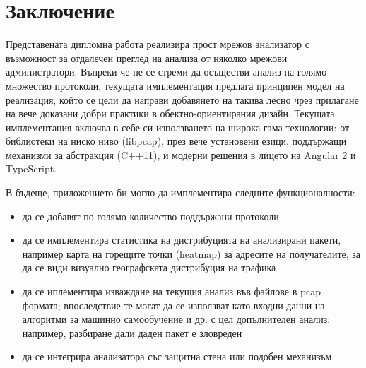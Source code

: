 \documentclass[12pt,a4paper,oneside]{book}
\begin{document}
\chapter{Заключение}

Представената дипломна работа реализира прост мрежов анализатор с възможност
за отдалечен преглед на анализа от няколко мрежови администратори.
Въпреки че не се стреми да осъществи анализ на голямо множество протоколи,
текущата имплементация предлага принципен модел на реализация, който се
цели да направи добавянето на такива лесно чрез прилагане на вече доказани
добри практики в обектно-ориентирания дизайн. Текущата имплементация включва
в себе си използването на широка гама технологии: от библиотеки на ниско ниво (libpcap),
през вече установени езици, поддържащи механизми за абстракция (C++11),
и модерни решения в лицето на Angular 2 и TypeScript.

В бъдеще, приложението би могло да имплементира следните функционалности:

\begin{itemize}
  \item
  да се добавят по-голямо количество поддържани протоколи
\item
  да се имплементира статистика на дистрибуцията на анализирани пакети,
  например карта на горещите точки (heatmap) за адресите на получателите, за
  да се види визуално географската дистрибуция на трафика
\item
  да се иплементира изваждане на текущия анализ във файлове в pcap формата;
  впоследствие те могат да се използват като входни данни на алгоритми за
  машинно самообучение и др. с цел допълнителен анализ: например, разбиране
  дали даден пакет е зловреден
\item
  да се интегрира анализатора със защитна стена или подобен механизъм
\end{itemize}




\listoffigures
\end{document}
